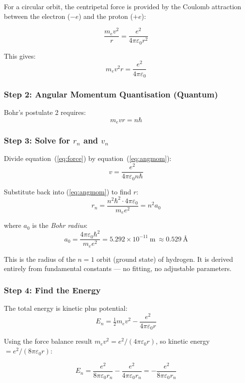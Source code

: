 \documentclass[12pt, a4paper]{book}
\newcommand{\newterm}[1]{\textit{\textcolor{DiscoveryColor}{#1}}}
\begin{document}
For a circular orbit, the centripetal force is provided
by the Coulomb attraction between the electron ($-e$)
and the proton ($+e$):

\[
  \frac{m_e v^2}{r} = \frac{e^2}{4\pi\varepsilon_0 r^2}
\]

This gives:
\begin{equation}
  m_e v^2 r = \frac{e^2}{4\pi\varepsilon_0}
  \label{eq:force}
\end{equation}

\subsubsection{Step 2: Angular Momentum Quantisation (Quantum)}

Bohr's postulate 2 requires:
\begin{equation}
  m_e v r = n\hbar
  \label{eq:angmom}
\end{equation}

\subsubsection{Step 3: Solve for $r_n$ and $v_n$}

Divide equation~(\ref{eq:force}) by equation~(\ref{eq:angmom}):
\[
  v = \frac{e^2}{4\pi\varepsilon_0 n\hbar}
\]

Substitute back into (\ref{eq:angmom}) to find $r$:
\[
  r_n = \frac{n^2 \hbar^2 \cdot 4\pi\varepsilon_0}{m_e e^2}
      = n^2 a_0
\]

where $a_0$ is the \newterm{Bohr radius}:
\[
  \boxed{a_0 = \frac{4\pi\varepsilon_0\hbar^2}{m_e e^2}
              = 5.292 \times 10^{-11}\ \si{\metre}\ \approx 0.529\ \text{\AA}}
\]

This is the radius of the $n=1$ orbit (ground state) of hydrogen.
It is derived entirely from fundamental constants ---
no fitting, no adjustable parameters.

\subsubsection{Step 4: Find the Energy}

The total energy is kinetic plus potential:
\[
  E_n = \tfrac{1}{2}m_e v^2 - \frac{e^2}{4\pi\varepsilon_0 r}
\]

Using the force balance result $m_e v^2 = e^2/(4\pi\varepsilon_0 r)$,
so kinetic energy $= e^2/(8\pi\varepsilon_0 r)$:

\[
  E_n = \frac{e^2}{8\pi\varepsilon_0 r_n} - \frac{e^2}{4\pi\varepsilon_0 r_n}
      = -\frac{e^2}{8\pi\varepsilon_0 r_n}
\]
\end{document}
